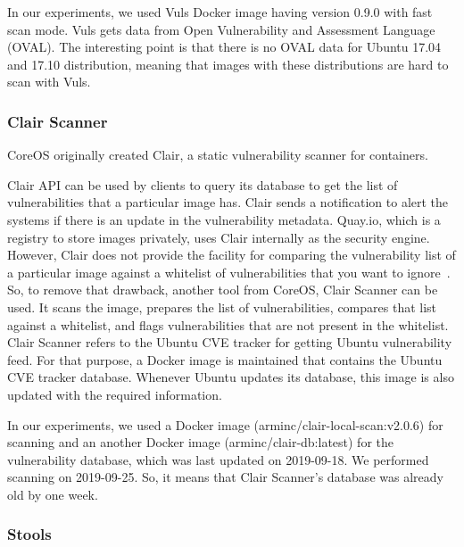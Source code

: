 \documentclass[a4paper,num-refs]{oup-contemporary}
\begin{document}
In our experiments, we used Vuls Docker image having version 0.9.0 with fast scan mode.
Vuls gets data from Open Vulnerability and Assessment Language (OVAL).
The interesting point is that there is no OVAL data for Ubuntu 17.04 and 17.10 distribution,
meaning that images with these distributions are hard to scan with Vuls.

\subsubsection{Clair Scanner}

CoreOS originally created Clair, a static vulnerability scanner for containers. 

Clair API can be used by clients to query its database to get
the list of vulnerabilities that a particular image has. Clair sends a notification
to alert the systems if there is an update in the vulnerability metadata. Quay.io, which
is a registry to store images privately, uses Clair internally as the security engine. However, Clair does not 
provide the facility for comparing
the vulnerability list of a particular image against a whitelist of vulnerabilities that you
want to ignore~\cite{arminc_2019}. 
So, to remove
that drawback, another tool from CoreOS, Clair Scanner can be used. It scans the image, prepares the list of
vulnerabilities, compares that list against a whitelist, and flags vulnerabilities
that are not present in the whitelist.
Clair Scanner refers to the Ubuntu CVE tracker for getting Ubuntu vulnerability feed.
For that purpose, a Docker image is maintained that contains the Ubuntu CVE tracker database.
Whenever Ubuntu updates its database, this image is also updated with the required information.

In our experiments, we used a Docker image (arminc/clair-local-scan:v2.0.6) for scanning
and an another Docker image (arminc/clair-db:latest) for the vulnerability database, which was
last updated on 2019-09-18. We performed
scanning on 2019-09-25. So, it means that Clair Scanner's database was already
old by one week.

\subsubsection{Stools}
\end{document}
